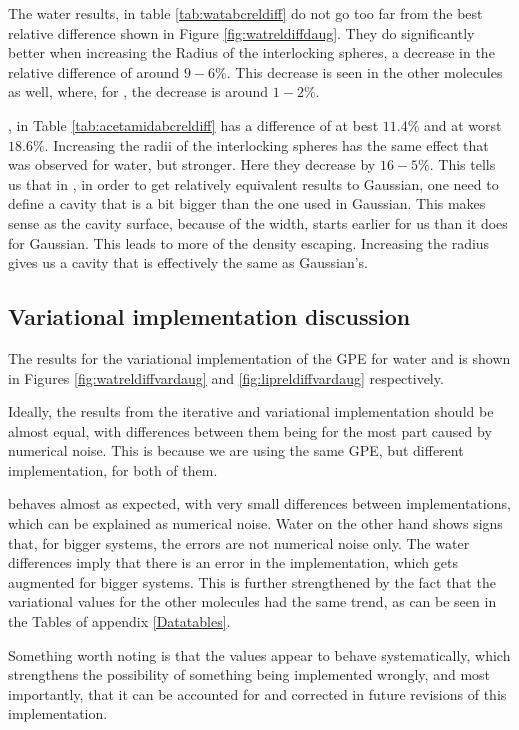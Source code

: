 \documentclass[../master_thesis.tex]{subfiles}
\begin{document}
The water results, in table \ref{tab:watabcreldiff} do not go too far from the best relative difference
shown in Figure \ref{fig:watreldiffdaug}. They do significantly better when increasing
the Radius of the interlocking spheres, a decrease in the relative difference of
around $9-6\%$. This decrease is seen in the other molecules as well, where,
for , the decrease is around $1-2\%$.

, in Table \ref{tab:acetamidabcreldiff} has a difference of at
best $11.4\%$ and at worst $18.6\%$. Increasing the radii of the interlocking spheres
has the same effect that was observed for water, but stronger. Here they decrease by
$ 16-5\%$.  This tells us that in \mrchem, in order to get relatively equivalent results to
Gaussian, one need to define a cavity that is a bit bigger than the one used in Gaussian.
This makes sense as the cavity surface, because of the width, starts earlier for us
than it does for Gaussian. This leads to more of the density escaping. Increasing the
radius gives us a cavity that is effectively the same as Gaussian's.

\subsection{Variational implementation discussion}
The results for the variational implementation of the \ac{GPE} for water and 
is shown in Figures \ref{fig:watreldiffvardaug} and \ref{fig:lipreldiffvardaug}
respectively.

Ideally, the results from the iterative and variational implementation should be
almost equal, with differences between them being for the most part caused by numerical
noise. This is because we are using the same \ac{GPE}, but different implementation,
for both of them.

 behaves almost as expected, with very small differences between implementations,
which can be explained as numerical noise. Water on the other hand shows signs that,
for bigger systems, the errors are not numerical noise only. The water differences imply
that there is an error in the implementation, which gets augmented for bigger systems.
This is further strengthened by the fact that the variational values for the other
molecules had the same trend, as can be seen in the Tables of appendix \ref{Datatables}.

Something worth noting is that the values appear to behave systematically,
which strengthens the possibility of something being implemented wrongly, and most
importantly, that it can be accounted for and corrected in future revisions of
this implementation.
\end{document}
